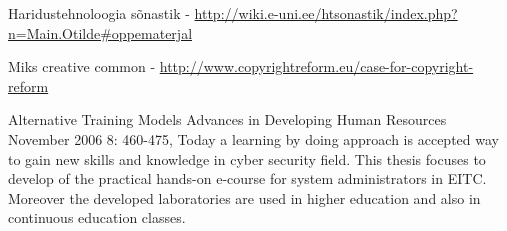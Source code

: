 Haridustehnoloogia sõnastik - \url{http://wiki.e-uni.ee/htsonastik/index.php?n=Main.Otilde#oppematerjal}

Miks creative common - \url{http://www.copyrightreform.eu/case-for-copyright-reform}

Alternative Training Models
Advances in Developing Human Resources November 2006 8: 460-475,
Today a learning by doing approach is accepted way to gain new skills and knowledge in cyber security field. This thesis focuses to develop of the practical hands-on e-course for system administrators in \gls{EITC}. Moreover the developed laboratories are used in higher education and also in continuous education classes.

%